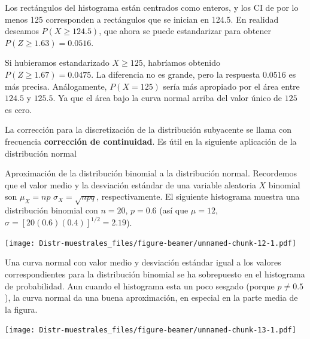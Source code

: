 \documentclass[
  10pt,
  ignorenonframetext,
]{beamer}
\begin{document}
\begin{frame}{}
\protect\hypertarget{section-33}{}
Los rectángulos del histograma están centrados como enteros, y los CI de
por lo menos 125 corresponden a rectángulos que se inician en 124.5. En
realidad deseamos \(P(X \ge 124.5)\), que ahora se puede estandarizar
para obtener \(P(Z \ge 1.63) = 0.0516\).

Si hubieramos estandarizado \(X \ge 125\), habríamos obtenido
\(P(Z \ge 1.67) = 0.0475\). La diferencia no es grande, pero la
respuesta \(0.0516\) es más precisa. Análogamente, \(P(X = 125)\) sería
más apropiado por el área entre \(124.5\) y \(125.5\). Ya que el área
bajo la curva normal arriba del valor único de \(125\) es cero.

La corrección para la discretización de la distribución subyacente se
llama con frecuencia \textbf{corrección de continuidad}. Es útil en la
siguiente aplicación de la distribución normal
\end{frame}

\begin{frame}{Aproximación de la distribución binomial a la distribución
normal.}
\protect\hypertarget{aproximaciuxf3n-de-la-distribuciuxf3n-binomial-a-la-distribuciuxf3n-normal.}{}
Recordemos que el valor medio y la desviación estándar de una variable
aleatoria \(X\) binomial son \(\mu_X = np\) \(\sigma_X = \sqrt{npq}\),
respectivamente. El siguiente histograma muestra una distribución
binomial con \(n = 20\), \(p = 0.6\) (así que \(\mu = 12\),
\(\sigma = [20(0.6)(0.4)]^{1/2} = 2.19\)).

\texttt{[image: Distr-muestrales\_files/figure-beamer/unnamed-chunk-12-1.pdf]}
\end{frame}

\begin{frame}{}
\protect\hypertarget{section-34}{}
Una curva normal con valor medio y desviación estándar igual a los
valores correspondientes para la distribución binomial se ha sobrepuesto
en el histograma de probabilidad. Aun cuando el histograma esta un poco
sesgado (porque \(p \ne 0.5\)), la curva normal da una buena
aproximación, en especial en la parte media de la figura.

\texttt{[image: Distr-muestrales\_files/figure-beamer/unnamed-chunk-13-1.pdf]}
\end{frame}
\end{document}
